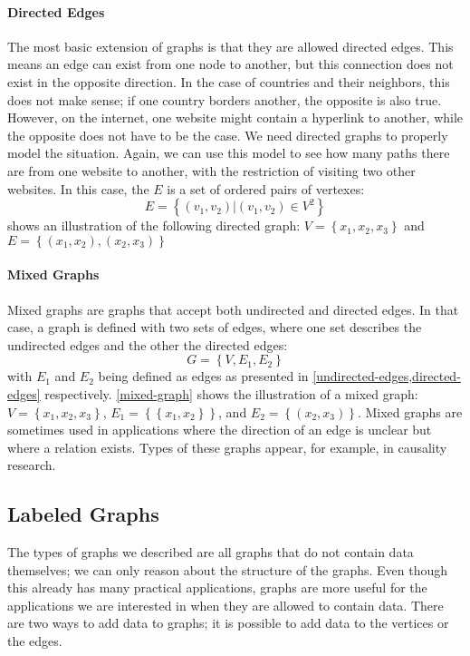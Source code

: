 \paragraph{Directed Edges} The most basic extension of graphs is that they are allowed directed edges. This means an edge can exist from one node to another, but this connection does not exist in the opposite direction. In the case of countries and their neighbors, this does not make sense; if one country borders another, the opposite is also true. However, on the internet, one website might contain a hyperlink to another, while the opposite does not have to be the case. We need directed graphs to properly model the situation. Again, we can use this model to see how many paths there are from one website to another, with the restriction of visiting two other websites. In this case, the $E$ is a set of ordered pairs of vertexes:
\begin{equation}
	E = \left\{\left(v_1, v_2\right) | \left(v_1, v_2\right) \in V^2\right\}
	\label{directed-edges}
\end{equation}
 shows an illustration of the following directed graph:
$V = \left\{x_1, x_2, x_3\right\}$ and $E = \left\{\left(x_1, x_2\right), \left(x_2, x_3\right)\right\}$

\paragraph{Mixed Graphs}
Mixed graphs are graphs that accept both undirected and directed edges. In that case, a graph is defined with two sets of edges, where one set describes the undirected edges and the other the directed edges:
\begin{equation}
	G = \left\{V, E_1, E_2\right\}
\end{equation}
with $E_1$ and $E_2$ being defined as edges as presented in \cref{undirected-edges,directed-edges} respectively. \cref{mixed-graph} shows the illustration of a mixed graph:
$V = \left\{x_1, x_2, x_3\right\}$, $E_1 = \left\{\left\{x_1, x_2\right\}\right\}$, and $E_2 = \left\{\left(x_2, x_3\right)\right\}$.
Mixed graphs are sometimes used in applications where the direction of an edge is unclear but where a relation exists. Types of these graphs appear, for example, in causality research. 

\subsection{Labeled Graphs}
The types of graphs we described are all graphs that do not contain data themselves; we can only reason about the structure of the graphs. Even though this already has many practical applications, graphs are more useful for the applications we are interested in when they are allowed to contain data. There are two ways to add data to graphs; it is possible to add data to the vertices or the edges.

